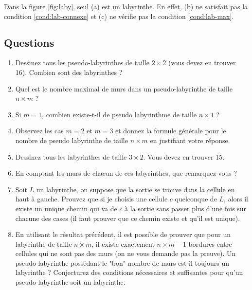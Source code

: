 \documentclass{../ficheTDTP}
\begin{document}
Dans la figure \ref{fig:laby}, seul (a) est un labyrinthe. En effet, (b) ne satisfait pas la condition \eqref{cond:lab-connexe} et (c) ne vérifie pas la condition \eqref{cond:lab-max}.


\subsection{Questions}

\begin{enumerate}

\item Dessinez tous les pseudo-labyrinthes de taille $2 \times 2$ (vous devez en trouver 16). Combien sont des labyrinthes ? 

\item Quel est le nombre maximal de murs dans un pseudo-labyrinthe de taille $n \times m$ ?

\item Si $m=1$, combien existe-t-il de pseudo labyrinthme de taille $n \times 1$ ?

\item Observez les cas $m=2$ et $m=3$ et donnez la formule générale pour le nombre de pseudo labyrinthe de taille $n \times m$ en justifiant votre réponse.

\item Dessinez tous les labyrinthes de taille $3 \times 2$. Vous devez en trouver 15. 

\item En comptant les murs de chacun de ces labyrinthes, que remarquez-vous ? 

\item Soit $L$ un labyrinthe, on suppose que la sortie se trouve dans la cellule en haut à gauche. Prouvez que si je choisis une cellule $c$ quelconque de $L$, alors il existe un unique chemin qui va de $c$ à la sortie sans passer plus d'une fois sur chacune des cases (il faut prouver que ce chemin existe et qu'il est unique). 


\item En utilisant le résultat précédent, il est possible de prouver que pour un labyrinthe de taille $n \times m$, il existe exactement $n \times m - 1$ bordures entre cellules qui ne sont pas des murs (on ne vous demande pas la preuve). Un pseudo-labyrinthe possédant le "bon" nombre de murs est-il toujours un labyrinthe ? Conjecturez des conditions nécessaires et suffisantes pour qu'un pseudo-labyrinthe soit un labyrinthe. 

\end{enumerate}
\end{document}
